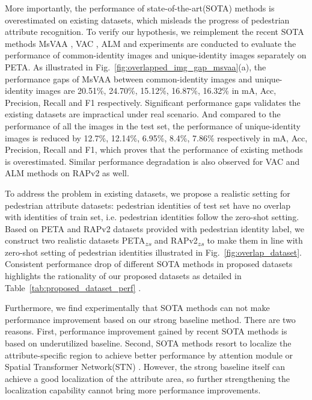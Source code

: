 \documentclass[runningheads]{llncs}
\begin{document}
More importantly, the performance of state-of-the-art(SOTA) methods is overestimated on existing datasets, which misleads the progress of pedestrian attribute recognition. To verify our hypothesis, we reimplement the recent SOTA methods MsVAA \cite{sarafianos2018deep}, VAC \cite{guo2019visual}, ALM \cite{tang2019Improving} and experiments are conducted to evaluate the performance of common-identity images and unique-identity images separately on PETA. As illustrated in Fig.~\ref{fig:overlapped_img_gap_msvaa}(a), the performance gaps of MsVAA between common-identity images and unique-identity images are 20.51\%, 24.70\%, 15.12\%, 16.87\%, 16.32\% in mA, Acc, Precision, Recall and F1 respectively. Significant performance gaps validates the existing datasets are impractical under real scenario. And compared to the performance of all the images in the test set, the performance of unique-identity images is reduced by 12.7\%, 12.14\%, 6.95\%, 8.4\%, 7.86\% respectively in mA, Acc, Precision, Recall and F1, which proves that the performance of existing methods is overestimated. Similar performance degradation is also observed for VAC and ALM methods on RAPv2 as well.

To address the problem in existing datasets, we propose a realistic  setting for pedestrian attribute datasets: pedestrian identities of test set have no overlap with identities of train set, i.e. pedestrian identities follow the zero-shot setting. Based on PETA \cite{deng2014pedestrian} and RAPv2 \cite{li2018richly} datasets provided with pedestrian identity label, we construct two realistic datasets PETA\textsubscript{$zs$} and RAPv2\textsubscript{$zs$} to make them in line with zero-shot setting of pedestrian identities illustrated in Fig.~\ref{fig:overlap_dataset}. Consistent performance drop of different SOTA methods in proposed datasets highlights the rationality of our proposed datasets as detailed in Table~\ref{tab:proposed_dataset_perf} .

Furthermore, we find experimentally that SOTA methods can not make performance improvement based on our strong baseline method. There are two reasons. First, performance improvement gained by recent SOTA methods is based on underutilized baseline. Second, SOTA methods resort to localize the attribute-specific region to achieve better performance by attention module \cite{sarafianos2018deep,guo2019visual} or Spatial Transformer Network(STN) \cite{tang2019Improving}. However, the strong baseline itself can achieve a good localization of the attribute area, so further strengthening the localization capability cannot bring more performance improvements.
\end{document}
